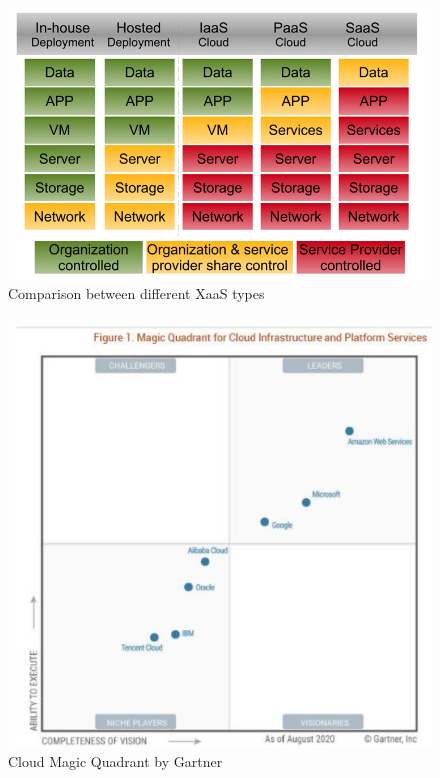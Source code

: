 \documentclass[../Main.tex]{subfiles}
\begin{document}
\begin{figure}[H]
    \centering
    \includegraphics[width=1\linewidth]{Images/datan/xaas.png}
    \caption{Comparison between different XaaS types}
\end{figure}

\begin{figure}[H]
    \centering
    \includegraphics[width=0.75\linewidth]{Images/datan/gartner-cloud.png}
    \caption{Cloud Magic Quadrant by Gartner}
\end{figure}
\end{document}
